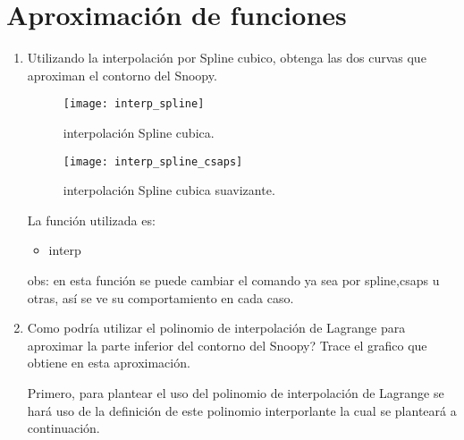 \documentclass{udpreport}
\begin{document}
\chapter{Aproximación de funciones} 
\begin{enumerate}
    
\vspace{0.9cm}

Se desea dibujar el contorno del dibujo de Snoopy:


\begin{figure}[H]
    \centering
    \texttt{[image: enun1]}
    \caption{enunciado.} \label{fig:enun1}
\end{figure}




\item Utilizando la interpolación por Spline cubico, obtenga las dos curvas que aproximan el contorno del  Snoopy.


\begin{figure}[H]
    \centering
    \texttt{[image: interp\_spline]}
    \caption{interpolación Spline cubica.} \label{fig:interp_spline}
\end{figure}

\begin{figure}[H]
    \centering
    \texttt{[image: interp\_spline\_csaps]}
    \caption{interpolación Spline cubica suavizante.} \label{fig:interp_spline_csaps}
\end{figure}
\newpage
La función utilizada es:
 
\begin{itemize}
\item interp
\end{itemize}
obs: en esta función se puede cambiar el comando ya sea por spline,csaps u otras, así se ve su comportamiento en cada caso.
\item Como podría utilizar el polinomio de interpolación de Lagrange para aproximar la parte inferior del contorno del Snoopy? Trace el grafico que obtiene en esta aproximación.

Primero, para plantear el uso del polinomio de interpolación de Lagrange se hará uso de la definición de este polinomio interporlante la cual se planteará a continuación.


\end{enumerate}
\end{document}
